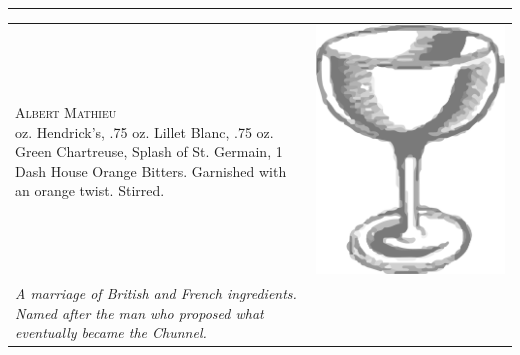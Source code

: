 \documentclass{article}
\begin{document}
\\[.5in]\vspace{-1in}\rule{\textwidth}{1.5pt}


\newpage


\begin{tabular}{*{2}{m{}}}
{\raggedleft\huge\textsc{Albert Mathieu}\\*}
\raggedleft 2 oz. Hendrick's, .75 oz. Lillet Blanc, .75 oz. Green Chartreuse, Splash of St. Germain, 1 Dash House Orange Bitters. Garnished with an orange twist. Stirred.& \includegraphics{egg_coupe.png}\\
\raggedleft\small\textit{A marriage of British and French ingredients. Named after the man who proposed what eventually became the Chunnel.}
\end{tabular}
\end{document}
